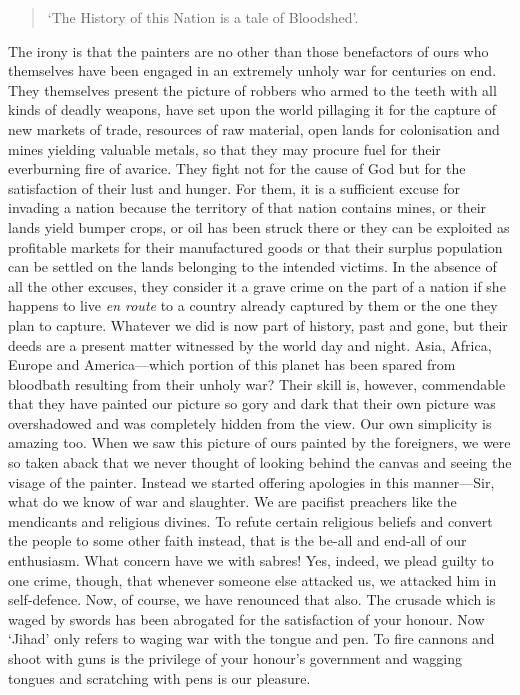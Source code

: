 \begin{quote}
`The History of this Nation is a tale of Bloodshed'.
\end{quote}

The irony is that the painters are no other than those benefactors of
ours who themselves have been engaged in an extremely unholy war for
centuries on end. They themselves present the picture of robbers who
armed to the teeth with all kinds of deadly weapons, have set upon the
world pillaging it for the capture of new markets of trade, resources of
raw material, open lands for colonisation and mines
yielding valuable metals, so that they may procure fuel for their
everburning fire of avarice. They fight not for the cause of God but for
the satisfaction of their lust and hunger. For them, it is a sufficient
excuse for invading a nation because the territory of that nation
contains mines, or their lands yield bumper crops, or oil has been
struck there or they can be exploited as profitable markets for their
manufactured goods or that their surplus population can be settled on
the lands belonging to the intended victims. In the absence of all the
other excuses, they consider it a grave crime on the part of a nation if
she happens to live \emph{en route} to a country already captured by
them or the one they plan to capture. Whatever we did is now part of
history, past and gone, but their deeds are a present matter witnessed
by the world day and night. Asia, Africa, Europe and America---which
portion of this planet has been spared from bloodbath resulting from
their unholy war? Their skill is, however, commendable that they have
painted our picture so gory and dark that their own picture was
overshadowed and was completely hidden from the view. Our own simplicity
is amazing too. When we saw this picture of ours painted by the
foreigners, we were so taken aback that we never thought of looking
behind the canvas and seeing the visage of the painter. Instead we
started offering apologies in this manner---Sir, what do we know of war
and slaughter. We are pacifist preachers like the mendicants and
religious divines. To refute certain religious beliefs and convert the
people to
some other faith instead, that is the be-all and end-all of our
enthusiasm. What concern have we with sabres! Yes, indeed, we plead
guilty to one crime, though, that whenever someone else attacked us, we
attacked him in self-defence. Now, of course, we have renounced that
also. The crusade which is waged by swords has been abrogated for the
satisfaction of your honour. Now `Jihad' only refers to waging war with
the tongue and pen. To fire cannons and shoot with guns is the privilege
of your honour's government and wagging tongues and scratching with pens
is our pleasure.

